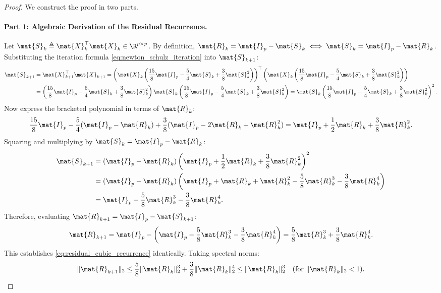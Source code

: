 \begin{proof}
We construct the proof in two parts.

\paragraph{Part 1: Algebraic Derivation of the Residual Recurrence.}
Let $\mat{S}_k \triangleq \mat{X}_k^\top \mat{X}_k \in \R^{p \times p}$. By definition, $\mat{R}_k = \mat{I}_p - \mat{S}_k \iff \mat{S}_k = \mat{I}_p - \mat{R}_k$. Substituting the iteration formula \eqref{eq:newton_schulz_iteration} into $\mat{S}_{k+1}$:
\begin{align}
\mat{S}_{k+1} &= \mat{X}_{k+1}^\top \mat{X}_{k+1} = \left( \mat{X}_k \left( \frac{15}{8}\mat{I}_p - \frac{5}{4}\mat{S}_k + \frac{3}{8}\mat{S}_k^2 \right) \right)^\top \left( \mat{X}_k \left( \frac{15}{8}\mat{I}_p - \frac{5}{4}\mat{S}_k + \frac{3}{8}\mat{S}_k^2 \right) \right) \nonumber \\
&= \left( \frac{15}{8}\mat{I}_p - \frac{5}{4}\mat{S}_k + \frac{3}{8}\mat{S}_k^2 \right) \mat{S}_k \left( \frac{15}{8}\mat{I}_p - \frac{5}{4}\mat{S}_k + \frac{3}{8}\mat{S}_k^2 \right) = \mat{S}_k \left( \frac{15}{8}\mat{I}_p - \frac{5}{4}\mat{S}_k + \frac{3}{8}\mat{S}_k^2 \right)^2.
\end{align}
Now express the bracketed polynomial in terms of $\mat{R}_k$:
\begin{equation}
\frac{15}{8}\mat{I}_p - \frac{5}{4}(\mat{I}_p - \mat{R}_k) + \frac{3}{8}(\mat{I}_p - 2\mat{R}_k + \mat{R}_k^2) = \mat{I}_p + \frac{1}{2}\mat{R}_k + \frac{3}{8}\mat{R}_k^2.
\end{equation}
Squaring and multiplying by $\mat{S}_k = \mat{I}_p - \mat{R}_k$:
\begin{align}
\mat{S}_{k+1} &= (\mat{I}_p - \mat{R}_k) \left( \mat{I}_p + \frac{1}{2}\mat{R}_k + \frac{3}{8}\mat{R}_k^2 \right)^2 \nonumber \\
&= (\mat{I}_p - \mat{R}_k) \left( \mat{I}_p + \mat{R}_k + \mat{R}_k^2 - \frac{5}{8}\mat{R}_k^3 - \frac{3}{8}\mat{R}_k^4 \right) \nonumber \\
&= \mat{I}_p - \frac{5}{8}\mat{R}_k^3 - \frac{3}{8}\mat{R}_k^4.
\end{align}
Therefore, evaluating $\mat{R}_{k+1} = \mat{I}_p - \mat{S}_{k+1}$:
\begin{equation}
\mat{R}_{k+1} = \mat{I}_p - \left( \mat{I}_p - \frac{5}{8} \mat{R}_k^3 - \frac{3}{8} \mat{R}_k^4 \right) = \frac{5}{8} \mat{R}_k^3 + \frac{3}{8} \mat{R}_k^4.
\end{equation}
This establishes \eqref{eq:residual_cubic_recurrence} identically. Taking spectral norms:
\begin{equation}
\| \mat{R}_{k+1} \|_2 \le \frac{5}{8} \| \mat{R}_k \|_2^3 + \frac{3}{8} \| \mat{R}_k \|_2^4 \le \| \mat{R}_k \|_2^3 \quad (\text{for } \|\mat{R}_k\|_2 < 1).
\end{equation}


\end{proof}
